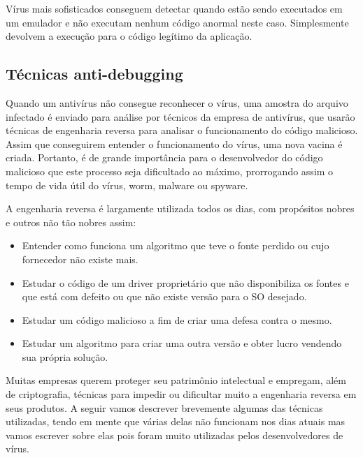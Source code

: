 Vírus mais sofisticados conseguem detectar quando estão sendo executados em um emulador e não executam nenhum código anormal neste caso. Simplesmente devolvem a execução para o código legítimo da aplicação.

\subsection{Técnicas anti-debugging} 
Quando um antivírus não consegue reconhecer o vírus, uma amostra do arquivo infectado é enviado para análise por técnicos da empresa de antivírus, que usarão técnicas de engenharia reversa para analisar o funcionamento do código malicioso. Assim que conseguirem entender o funcionamento do vírus, uma nova vacina é criada. Portanto, é de grande importância para o desenvolvedor do código malicioso que este processo seja dificultado ao máximo, prorrogando assim o tempo de vida útil do vírus, worm, malware ou spyware. 

A engenharia reversa é largamente utilizada todos os dias, com propósitos nobres e outros não tão nobres assim:
\begin{itemize}
 \item Entender como funciona um algoritmo que teve o fonte perdido ou cujo fornecedor não existe mais.
 \item Estudar o código de um driver proprietário que não disponibiliza os fontes e que está com defeito ou que não existe versão para o SO desejado. 
 \item Estudar um código malicioso a fim de criar uma defesa contra o mesmo.
 \item Estudar um algoritmo para criar uma outra versão e obter lucro vendendo sua própria solução.
\end{itemize}

Muitas empresas querem proteger seu patrimônio intelectual e empregam, além de criptografia, técnicas para impedir ou dificultar muito a engenharia reversa em seus produtos. A seguir vamos descrever brevemente algumas das técnicas utilizadas, tendo em mente que várias delas não funcionam nos dias atuais mas vamos escrever sobre elas pois foram muito utilizadas pelos desenvolvedores de vírus. 

